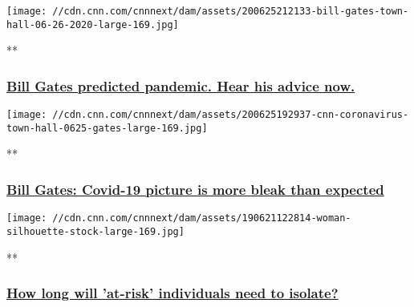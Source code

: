 \href{/videos/health/2020/06/26/bill-gates-virus-prediction-advice-town-hall-vpx.cnn/video/playlists/cnn-coronavirus-town-hall/}{}

\texttt{[image: //cdn.cnn.com/cnnnext/dam/assets/200625212133-bill-gates-town-hall-06-26-2020-large-169.jpg]}

**

\hypertarget{bill-gates-predicted-pandemic-hear-his-advice-now}{%
\subsubsection{\texorpdfstring{\href{/videos/health/2020/06/26/bill-gates-virus-prediction-advice-town-hall-vpx.cnn/video/playlists/cnn-coronavirus-town-hall/}{Bill
Gates predicted pandemic. Hear his advice
now.}}{Bill Gates predicted pandemic. Hear his advice now.}}\label{bill-gates-predicted-pandemic-hear-his-advice-now}}

\href{/videos/health/2020/06/26/bill-gates-coronavirus-us-town-hall-sot-vpx.cnn/video/playlists/cnn-coronavirus-town-hall/}{}

\texttt{[image: //cdn.cnn.com/cnnnext/dam/assets/200625192937-cnn-coronavirus-town-hall-0625-gates-large-169.jpg]}

**

\hypertarget{bill-gates-covid-19-picture-is-more-bleak-than-expected}{%
\subsubsection{\texorpdfstring{\href{/videos/health/2020/06/26/bill-gates-coronavirus-us-town-hall-sot-vpx.cnn/video/playlists/cnn-coronavirus-town-hall/}{Bill
Gates: Covid-19 picture is more bleak than
expected}}{Bill Gates: Covid-19 picture is more bleak than expected}}\label{bill-gates-covid-19-picture-is-more-bleak-than-expected}}

\href{/videos/health/2020/06/19/at-risk-individuals-isolate-dr-wen-town-hall-sot-vpx.cnn/video/playlists/cnn-coronavirus-town-hall/}{}

\texttt{[image: //cdn.cnn.com/cnnnext/dam/assets/190621122814-woman-silhouette-stock-large-169.jpg]}

**

\hypertarget{how-long-will-at-risk-individuals-need-to-isolate}{%
\subsubsection{\texorpdfstring{\href{/videos/health/2020/06/19/at-risk-individuals-isolate-dr-wen-town-hall-sot-vpx.cnn/video/playlists/cnn-coronavirus-town-hall/}{How
long will 'at-risk' individuals need to
isolate?}}{How long will 'at-risk' individuals need to isolate?}}\label{how-long-will-at-risk-individuals-need-to-isolate}}

